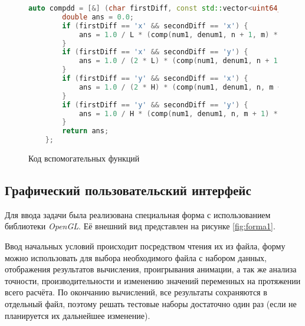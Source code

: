\begin{figure}
\begin{lstlisting}[language=C++]
    auto compdd = [&] (char firstDiff, const std::vector<uint64_t> &num1, const std::vector<uint64_t> &denum1, char secondDiff, const std::vector<uint64_t> &num2, const std::vector<uint64_t> &denum2, uint64_t n, uint64_t m) -> double {
        double ans = 0.0;
        if (firstDiff == 'x' && secondDiff == 'x') {
            ans = 1.0 / L * (comp(num1, denum1, n + 1, m) * (comp(num2, denum2, n + 1, m) - comp(num2, denum2, n, m)) / L - comp(num1, denum1, n - 1, m) * (comp(num2, denum2, n, m) - comp(num2, denum2, n - 1, m)) / L);
        }
        if (firstDiff == 'x' && secondDiff == 'y') {
            ans = 1.0 / (2 * L) * (comp(num1, denum1, n + 1, m) * (comp(num2, denum2, n + 1, m + 1) - comp(num2, denum2, n + 1, m - 1)) / (2 * H) - comp(num1, denum1, n - 1, m) * (comp(num2, denum2, n - 1, m + 1) - comp(num2, denum2, n - 1, m - 1)) / (2 * H));
        }
        if (firstDiff == 'y' && secondDiff == 'x') {
            ans = 1.0 / (2 * H) * (comp(num1, denum1, n, m + 1) * (comp(num2, denum2, n + 1, m + 1) - comp(num2, denum2, n - 1, m + 1)) / (2 * L) - comp(num1, denum1, n, m - 1) * (comp(num2, denum2, n + 1, m - 1) - comp(num2, denum2, n - 1, m - 1)) / (2 * L));
        }
        if (firstDiff == 'y' && secondDiff == 'y') {
            ans = 1.0 / H * (comp(num1, denum1, n, m + 1) * (comp(num2, denum2, n, m + 1) - comp(num2, denum2, n, m)) / H - comp(num1, denum1, n, m - 1) * (comp(num2, denum2, n, m) - comp(num2, denum2, n, m - 1)) / H);
        }
        return ans;
    };
\end{lstlisting}
\caption{Код вспомогательных функций}
\label{src:lamda_optimization_2}
\end{figure}

\subsection{Графический пользовательский интерфейс}

Для ввода задачи была реализована специальная форма с использованием библиотеки \textit{OpenGL}. Её внешний вид представлен на рисунке \ref{fig:forma1}.

Ввод начальных условий происходит посредством чтения их из файла, форму можно использовать для выбора необходимого файла с набором данных, отображения результатов вычисления, проигрывания анимации, а так же анализа точности, производительности и изменению значений переменных на протяжении всего расчёта. По окончанию вычислений, все результаты сохраняются в отдельный файл, поэтому решать тестовые наборы достаточно один раз (если не планируется их дальнейшее изменение).

